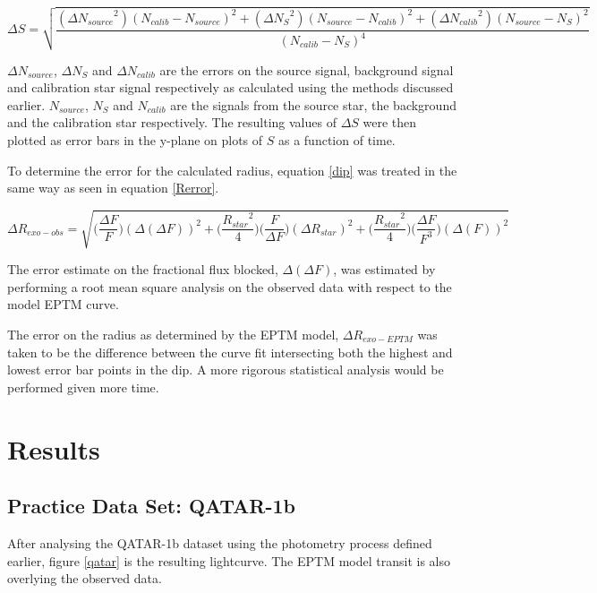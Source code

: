 \documentclass{report}
\begin{document}
\begin{equation} \label{errors}
    {\Delta S} = \sqrt{\frac{({\Delta N_{source}}^{2})(N_{calib}-N_{source})^{2} + ({\Delta N_{S}}^{2})(N_{source}-N_{calib})^2 + ({\Delta N_{calib}}^{2})(N_{source}-N_{S})^2}{(N_{calib}-N_{S})^4}}
\end{equation}

$\Delta N_{source}$, $\Delta N_{S}$ and $\Delta N_{calib}$ are the errors on the source signal, background signal and calibration star signal respectively as calculated using the methods discussed earlier. $N_{source}$, $N_{S}$ and $N_{calib}$ are the signals from the source star, the background and the calibration star respectively. The resulting values of $\Delta S$ were then plotted as error bars in the y-plane on plots of $S$ as a function of time.

To determine the error for the calculated radius, equation \ref{dip} was treated in the same way as seen in equation \ref{Rerror}.

\begin{equation} \label{Rerror}
    \Delta R_{exo-obs} = \sqrt{\Big(\frac{\Delta F}{F}\Big)(\Delta (\Delta F))^2 + \Big(\frac{{R_{star}}^2}{4}\Big)\Big(\frac{F}{\Delta F}\Big)(\Delta {R_{star}})^2 + \Big(\frac{{R_{star}}^2}{4}\Big)\Big(\frac{\Delta F}{F^3}\Big)(\Delta (F))^2}
\end{equation}

The error estimate on the fractional flux blocked, $\Delta(\Delta F)$, was estimated by performing a root mean square analysis on the observed data with respect to the model EPTM curve. 

The error on the radius as determined by the EPTM model, $\Delta R_{exo-EPTM}$ was taken to be the difference between the curve fit intersecting both the highest and lowest error bar points in the dip. A more rigorous statistical analysis would be performed given more time. 


\section{Results}

\subsection{Practice Data Set: QATAR-1b}
After analysing the QATAR-1b dataset using the photometry process defined earlier, figure \ref{qatar} is the resulting lightcurve. The EPTM model transit is also overlying the observed data. 
\end{document}

